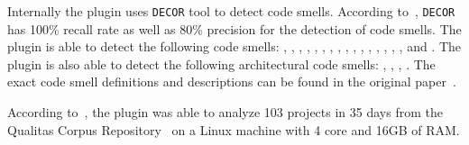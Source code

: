 Internally the  plugin uses \texttt{DECOR} tool to detect code smells.
According to~\citeauthor{sonar-plugin-external}, \texttt{DECOR} has 100\% recall rate as well as 80\% precision
for the detection of code smells.
The plugin is able to detect the following code smells: , ,
, , , ,
, , , ,
, , ,
, , ,  and
.
The plugin is also able to detect the following architectural code smells:
, , ,
.
The exact code smell definitions and descriptions can be found in the original paper~\cite{sonar-plugin-external}.

According to~\citeauthor{sonar-plugin-external}, the plugin was able to analyze 103 projects in 35 days
from the Qualitas Corpus Repository~\cite{qualitas-corpus} on a Linux machine with 4 core and 16GB of RAM\@.
